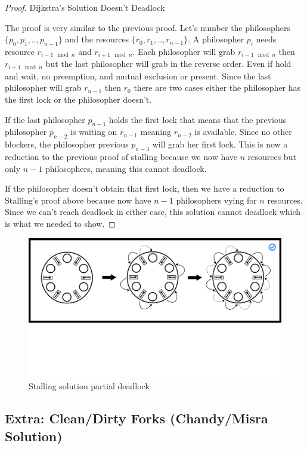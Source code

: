 \begin{proof} Dijkstra's Solution Doesn't Deadlock

The proof is very similar to the previous proof.
Let's number the philosophers $\{p_0, p_1, .., p_{n-1}\}$ and the resources $\{r_0, r_1, .., r_{n-1}\}$.
A philosopher $p_i$ needs resource $r_{i-1 \mod n}$ and $r_{i + 1 \mod n}$.
Each philosopher will grab $r_{i-1 \mod n}$ then $r_{i + 1 \mod n}$ but the last philosopher will grab in the reverse order.
Even if hold and wait, no preemption, and mutual exclusion or present.
Since the last philosopher will grab $r_{n-1}$ then $r_0$ there are two cases either the philosopher has the first lock or the philosopher doesn't.

If the last philosopher $p_{n-1}$ holds the first lock that means that the previous philosopher $p_{n-2}$ is waiting on $r_{n-1}$ meaning $r_{n-2}$ is available.
Since no other blockers, the philosopher previous $p_{n-3}$ will grab her first lock.
This is now a reduction to the previous proof of stalling because we now have $n$ resources but only $n-1$ philosophers, meaning this cannot deadlock.

If the philosopher doesn't obtain that first lock, then we have a reduction to Stalling's proof above because now have $n-1$ philosophers vying for $n$ resources.
Since we can't reach deadlock in either case, this solution cannot deadlock which is what we needed to show.

\end{proof}

\begin{figure}[H]
\centering
\includegraphics[width=.9\textwidth]{deadlock/drawings/dining_partial.png}
\caption{Stalling solution partial deadlock}
\end{figure}

\subsection{Extra: Clean/Dirty Forks (Chandy/Misra Solution)}


